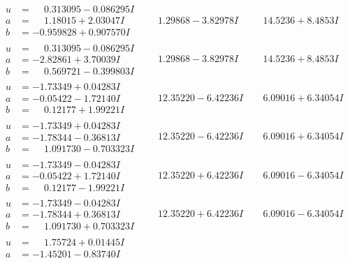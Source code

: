 \documentclass[1p]{elsarticle_modified}
\theoremstyle{definition}
\begin{document}
$$\begin{array}{c|c|c}
 \hline 
\begin{aligned}
u &= \phantom{-}0.313095 - 0.086295 I \\
a &= \phantom{-}1.18015 + 2.03047 I \\
b &= -0.959828 + 0.907570 I\end{aligned}
 & \phantom{-}1.29868 - 3.82978 I & \phantom{-}14.5236 + 8.4853 I \\ \hline\begin{aligned}
u &= \phantom{-}0.313095 - 0.086295 I \\
a &= -2.82861 + 3.70039 I \\
b &= \phantom{-}0.569721 - 0.399803 I\end{aligned}
 & \phantom{-}1.29868 - 3.82978 I & \phantom{-}14.5236 + 8.4853 I \\ \hline\begin{aligned}
u &= -1.73349 + 0.04283 I \\
a &= -0.05422 - 1.72140 I \\
b &= \phantom{-}0.12177 + 1.99221 I\end{aligned}
 & \phantom{-}12.35220 - 6.42236 I & \phantom{-}6.09016 + 6.34054 I \\ \hline\begin{aligned}
u &= -1.73349 + 0.04283 I \\
a &= -1.78344 - 0.36813 I \\
b &= \phantom{-}1.091730 - 0.703323 I\end{aligned}
 & \phantom{-}12.35220 - 6.42236 I & \phantom{-}6.09016 + 6.34054 I \\ \hline\begin{aligned}
u &= -1.73349 - 0.04283 I \\
a &= -0.05422 + 1.72140 I \\
b &= \phantom{-}0.12177 - 1.99221 I\end{aligned}
 & \phantom{-}12.35220 + 6.42236 I & \phantom{-}6.09016 - 6.34054 I \\ \hline\begin{aligned}
u &= -1.73349 - 0.04283 I \\
a &= -1.78344 + 0.36813 I \\
b &= \phantom{-}1.091730 + 0.703323 I\end{aligned}
 & \phantom{-}12.35220 + 6.42236 I & \phantom{-}6.09016 - 6.34054 I \\ \hline\begin{aligned}
u &= \phantom{-}1.75724 + 0.01445 I \\
a &= -1.45201 - 0.83740 I \\

\end{aligned}
\end{array}$$
\end{document}
